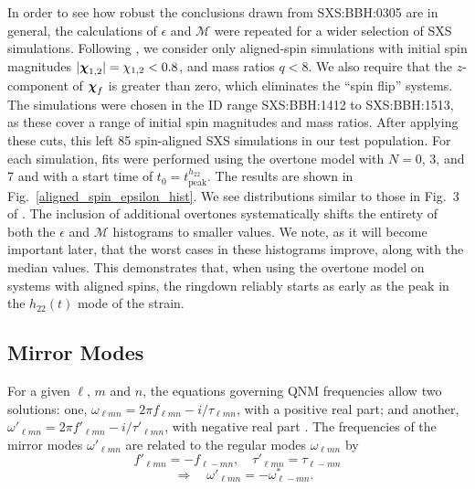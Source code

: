 In order to see how robust the conclusions drawn from SXS:BBH:0305 are in general, the calculations of $\epsilon$ and $\mathcal{M}$ were repeated for a wider selection of SXS simulations. Following \cite{overtones}, we consider only aligned-spin simulations with initial spin magnitudes $|\vb*{\chi}_{1,2}| = \chi_{1,2} < 0.8$, and mass ratios $q < 8$. We also require that the $z$-component of $\vb*{\chi}_f$ is greater than zero, which eliminates the ``spin flip'' systems. The simulations were chosen in the ID range SXS:BBH:1412 to SXS:BBH:1513, as these cover a range of initial spin magnitudes and mass ratios.
After applying these cuts, this left 85 spin-aligned SXS simulations in our test population.
For each simulation, fits were performed using the overtone model with $N=0$, 3, and 7 and with a start time of $t_0 = t_{\mathrm{peak}}^{h_{22}}$. 
The results are shown in Fig.~\ref{aligned_spin_epsilon_hist}. 
We see distributions similar to those in Fig.~3 of \cite{overtones}. 
The inclusion of additional overtones systematically shifts the entirety of both the $\epsilon$ and $\mathcal{M}$ histograms to smaller values.
We note, as it will become important later, that the worst cases in these histograms improve, along with the median values.
This demonstrates that, when using the overtone model on systems with aligned spins, the ringdown reliably starts as early as the peak in the $h_{22}(t)$ mode of the strain. 


\subsection{Mirror Modes} \label{subsec:mirror_modes}

For a given $\ell$, $m$ and $n$, the equations governing QNM frequencies allow two solutions: one, $\omega_{\ell m n} = 2\pi f_{\ell m n} - i/\tau_{\ell m n}$, with a positive real part; and another, $\omega'_{\ell m n} = 2\pi f'_{\ell m n} - i/ \tau'_{\ell m n}$, with negative real part \cite{mirror_modes, bcw}.
The frequencies of the mirror modes $\omega'_{\ell m n}$ are related to the regular modes $\omega_{\ell m n}$ by
\begin{equation}\label{mirrorsymmetry}
    f'_{\ell m n} = -f_{\ell -m n}, \quad \tau'_{\ell m n} = \tau_{\ell -m n} \nonumber
\end{equation}
\begin{equation} 
    \quad\Rightarrow\quad \omega'_{\ell mn} = - \omega_{\ell -mn}^*.
    \label{eq:sym_mirror_modes_conj}
\end{equation}

